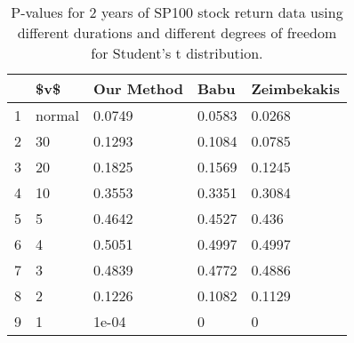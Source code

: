 \begin{table}[ht]
\centering
\caption{P-values for 2 years of SP100 stock return 
                   data using different durations
  and different degrees of freedom for Student's t distribution.} 
\label{table:SP1002}
\begin{tabular}{rllll}
  \hline
 & \$v\$ & Our Method & Babu & Zeimbekakis \\ 
  \hline
1 & normal & 0.0749 & 0.0583 & 0.0268 \\ 
  2 & 30 & 0.1293 & 0.1084 & 0.0785 \\ 
  3 & 20 & 0.1825 & 0.1569 & 0.1245 \\ 
  4 & 10 & 0.3553 & 0.3351 & 0.3084 \\ 
  5 & 5 & 0.4642 & 0.4527 & 0.436 \\ 
  6 & 4 & 0.5051 & 0.4997 & 0.4997 \\ 
  7 & 3 & 0.4839 & 0.4772 & 0.4886 \\ 
  8 & 2 & 0.1226 & 0.1082 & 0.1129 \\ 
  9 & 1 & 1e-04 & 0 & 0 \\ 
   \hline
\end{tabular}
\end{table}

